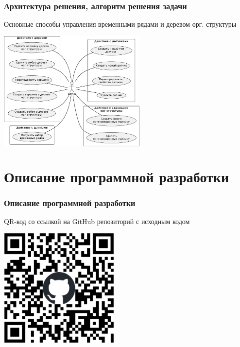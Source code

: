 \documentclass[pdf, hyperref={unicode}, aspectratio=169]{beamer}
\begin{document}
\begin{frame}
	\frametitle{Архитектура решения, алгоритм решения задачи}
	
	Основные способы управления временными рядами и деревом орг. структуры
	\begin{center}
		\includegraphics[height = 6cm]{usecases.eps}
	\end{center}
\end{frame}


\section{Описание программной разработки}
\begin{frame}
	\frametitle{Описание программной разработки}
	
	QR-код со ссылкой на GitHub репозиторий с исходным кодом
	
	\begin{center}
		\includegraphics[height = 6cm]{qr-git.eps}
	\end{center}
\end{frame}



\end{document}
